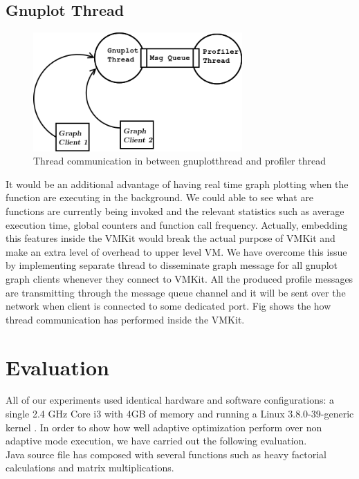 \subsection{Gnuplot Thread}
\begin{figure}[ht!]
\centering
\includegraphics[width=80mm]{gnuplotthread.png}
\caption{Thread communication in between gnuplotthread and profiler thread}
\label{fig:architecture}
\end{figure}
It would be an additional advantage of having real time graph plotting when the function are executing in the background. We could able to see what are functions are currently being invoked and the relevant statistics  such as average execution time, global counters and function call frequency. Actually, embedding this features inside the VMKit would break the actual purpose of VMKit and make an extra level of overhead to upper level VM. We have overcome this issue by implementing separate thread to disseminate graph message for all gnuplot graph clients whenever they connect to VMKit. All the produced  profile messages are transmitting through the message queue channel and it will be sent over the network when client is connected to some dedicated port. Fig shows the how thread communication has performed inside the VMKit.
\section {Evaluation}

All of our experiments used identical hardware and software configurations: a single 2.4 GHz Core i3  with 4GB of memory and running a Linux 3.8.0-39-generic kernel . In order to show how well adaptive optimization perform over non adaptive mode execution, we have carried out the following evaluation.\\
Java source file has composed with several functions such as  heavy factorial calculations and matrix multiplications. 

